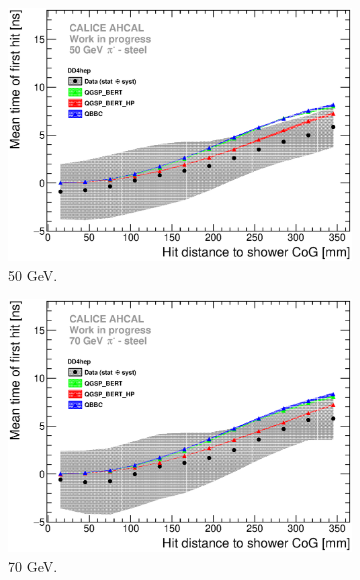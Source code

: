 \begin{figure}[htbp!]
\begin{subfigure}[t]{0.49\textwidth}
    \centering
    \includegraphics[width=1\textwidth]{../Thesis_Plots/Timing/Pions/Plots/ComparisonToSim/Time_Radius_50GeV_BL_DD4hep.eps}
    \caption{50 GeV.} \label{fig:Radius_BL_SimData_50GeV_DD4hep}
  \end{subfigure}
  \hfill
  \begin{subfigure}[t]{0.49\textwidth}
    \centering
    \includegraphics[width=1\textwidth]{../Thesis_Plots/Timing/Pions/Plots/ComparisonToSim/Time_Radius_70GeV_BL_DD4hep.eps}
    \caption{70 GeV.} \label{fig:Radius_BL_SimData_70GeV_DD4hep}
  \end{subfigure}
  \hfill
  \begin{subfigure}[t]{0.49\textwidth}
    \centering

\end{subfigure}
\end{figure}
